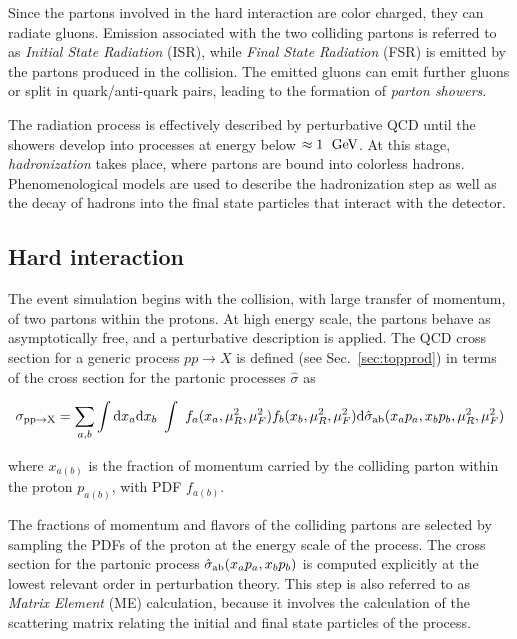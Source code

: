 Since the partons involved in the hard interaction are color charged,
they can radiate gluons. Emission associated with the two colliding partons  
is referred to as {\it Initial State Radiation} (ISR), while {\it
  Final State Radiation} (FSR) is emitted by the partons produced in
the collision. The emitted gluons can emit further gluons or split in
quark/anti-quark pairs, leading to the formation of {\it parton
  showers}.

The radiation process is effectively described by perturbative QCD until
the showers develop into processes at energy below
$\approx{}1~\; \mathrm{GeV}{}$. 
At this stage, {\it hadronization} takes place, where partons are
bound into colorless hadrons. Phenomenological models are used to
describe the hadronization step as well as the decay of hadrons into
the final state particles that interact with the detector.

\subsection{Hard interaction}
\label{sec:hardinteraction}

The event simulation begins with the collision, with large transfer of
momentum, of two partons within the protons. At high energy scale, the
partons behave as asymptotically free, and a perturbative description
is applied. The QCD cross section for a generic process $pp\to X$ is
defined (see Sec.~\ref{sec:topprod}) in terms of the cross section for
the partonic processes $\hat{\sigma}$ as

\begin{equation}
  \sigma_{{\rm pp}\to{\rm X}}
  = \sum_{a,b}
  \int{\rm d}x_a{\rm d}x_b
  ~ \int
  ~ f_a(x_a,\mu_R^2{},\mu_F^2{}) f_b(x_b,\mu_R^2{},\mu_F^2{})
  {\rm d}\hat{\sigma}_{\rm ab}(x_ap_a, x_bp_b,\mu_R^2{},\mu_F^2{}) \\
  \label{eq:qcdxsec}
\end{equation}

where $x_{a(b)}$ is the fraction of momentum carried by the colliding
parton within the proton $p_{a(b)}$, with PDF $f_{a(b)}$.

The fractions of momentum and flavors of the colliding partons are
selected by sampling the PDFs of the proton at the energy scale of the
process. The cross section for the partonic process $\hat{\sigma}_{\rm
  ab}(x_ap_a, x_bp_b)$ is computed explicitly at the lowest relevant
order in perturbation theory. This step is also referred to as {\it
  Matrix Element} (ME) calculation, because it involves the
calculation of the scattering matrix relating the initial and final
state particles of the process.

